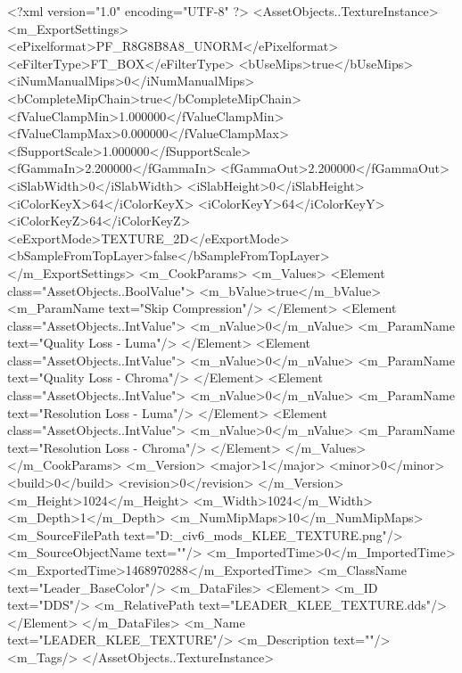 <?xml version="1.0" encoding="UTF-8" ?>
<AssetObjects..TextureInstance>
	<m_ExportSettings>
		<ePixelformat>PF_R8G8B8A8_UNORM</ePixelformat>
		<eFilterType>FT_BOX</eFilterType>
		<bUseMips>true</bUseMips>
		<iNumManualMips>0</iNumManualMips>
		<bCompleteMipChain>true</bCompleteMipChain>
		<fValueClampMin>1.000000</fValueClampMin>
		<fValueClampMax>0.000000</fValueClampMax>
		<fSupportScale>1.000000</fSupportScale>
		<fGammaIn>2.200000</fGammaIn>
		<fGammaOut>2.200000</fGammaOut>
		<iSlabWidth>0</iSlabWidth>
		<iSlabHeight>0</iSlabHeight>
		<iColorKeyX>64</iColorKeyX>
		<iColorKeyY>64</iColorKeyY>
		<iColorKeyZ>64</iColorKeyZ>
		<eExportMode>TEXTURE_2D</eExportMode>
		<bSampleFromTopLayer>false</bSampleFromTopLayer>
	</m_ExportSettings>
	<m_CookParams>
		<m_Values>
			<Element class="AssetObjects..BoolValue">
				<m_bValue>true</m_bValue>
				<m_ParamName text="Skip Compression"/>
			</Element>
			<Element class="AssetObjects..IntValue">
				<m_nValue>0</m_nValue>
				<m_ParamName text="Quality Loss - Luma"/>
			</Element>
			<Element class="AssetObjects..IntValue">
				<m_nValue>0</m_nValue>
				<m_ParamName text="Quality Loss - Chroma"/>
			</Element>
			<Element class="AssetObjects..IntValue">
				<m_nValue>0</m_nValue>
				<m_ParamName text="Resolution Loss - Luma"/>
			</Element>
			<Element class="AssetObjects..IntValue">
				<m_nValue>0</m_nValue>
				<m_ParamName text="Resolution Loss - Chroma"/>
			</Element>
		</m_Values>
	</m_CookParams>
	<m_Version>
		<major>1</major>
		<minor>0</minor>
		<build>0</build>
		<revision>0</revision>
	</m_Version>
	<m_Height>1024</m_Height>
	<m_Width>1024</m_Width>
	<m_Depth>1</m_Depth>
	<m_NumMipMaps>10</m_NumMipMaps>
	<m_SourceFilePath text="D:\Documents\GitHub\Uzuki_civ6_mods\Mondstadt\LEADER_KLEE_TEXTURE.png"/>
	<m_SourceObjectName text=""/>
	<m_ImportedTime>0</m_ImportedTime>
	<m_ExportedTime>1468970288</m_ExportedTime>
	<m_ClassName text="Leader_BaseColor"/>
	<m_DataFiles>
		<Element>
			<m_ID text="DDS"/>
			<m_RelativePath text="LEADER_KLEE_TEXTURE.dds"/>
		</Element>
	</m_DataFiles>
	<m_Name text="LEADER_KLEE_TEXTURE"/>
	<m_Description text=""/>
	<m_Tags/>
</AssetObjects..TextureInstance>

